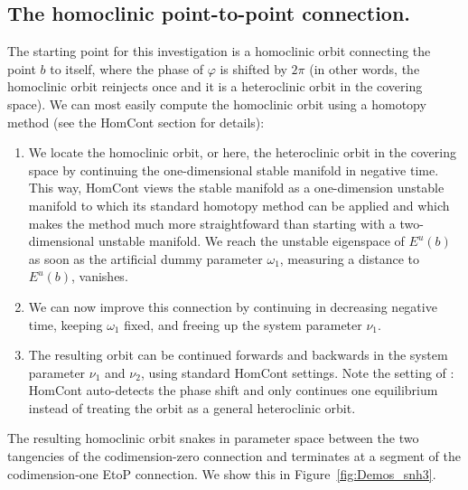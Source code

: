 \documentclass[12pt]{report}
\begin{document}
\subsection{The homoclinic point-to-point connection.}
The starting point for this investigation is a homoclinic orbit
connecting the point $b$ to itself, where the phase of $\varphi$ is
shifted by $2\pi$ (in other words, the homoclinic orbit reinjects
once and it is a heteroclinic orbit in the covering space).
We can most easily compute the homoclinic orbit using a 
homotopy method
(see the {\cal HomCont} section \label{sec:Starting_strategies} for details):

\begin{enumerate}
\item
We locate the homoclinic orbit, or here, the heteroclinic orbit in the
covering space by continuing the one-dimensional stable manifold in
negative time. This way, {\cal HomCont} views the stable manifold as a
one-dimension unstable manifold to which its standard homotopy method
can be applied and which makes the method much more straightfoward
than starting with a two-dimensional unstable manifold.
We reach the unstable eigenspace of $E^u(b)$ as soon as the artificial
dummy parameter $\omega_1$, measuring a distance to $E^u(b)$, vanishes.
\item
We can now improve this connection by continuing in decreasing negative time,
keeping $\omega_1$ fixed, and freeing up the system parameter $\nu_1$.
\item
The resulting orbit can be continued forwards and backwards in the
system parameter $\nu_1$ and $\nu_2$, using standard {\cal HomCont} settings.
Note the setting of : {\cal HomCont} auto-detects the phase
shift and only continues one equilibrium instead of treating
the orbit as a general heteroclinic orbit.
\end{enumerate}

The resulting homoclinic orbit snakes in parameter space between the two
tangencies of the codimension-zero connection and terminates at a
segment of the codimension-one EtoP connection. We show this in
Figure~\ref{fig:Demos_snh3}.
\end{document}
